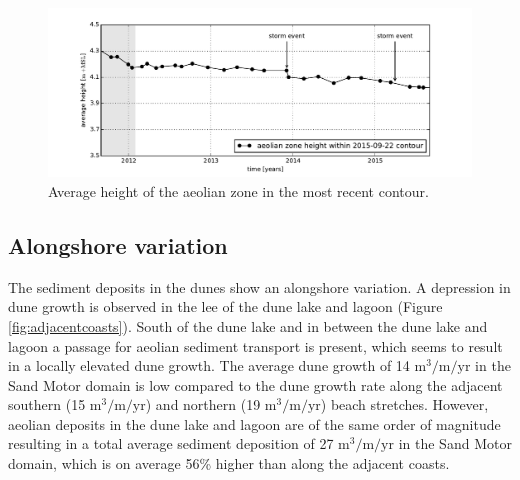 
\begin{figure}
  \centering
  \includegraphics[width=\columnwidth]{../Figures/heights}
  \caption{Average height of the aeolian zone in the most recent
    contour.}
  \label{fig:heights}
\end{figure}



\subsection{Alongshore variation}

The sediment deposits in the dunes show an alongshore
variation. A depression in dune growth is observed in the
lee of the dune lake and lagoon (Figure
\ref{fig:adjacentcoasts}). South of the dune lake and in between the
dune lake and lagoon a passage for aeolian sediment transport is
present, which seems to result in a locally elevated dune growth. The
average dune growth of 14 $\mathrm{m^3/m/yr}$ in the Sand Motor domain
is low compared to the dune growth rate along the adjacent southern
(15 $\mathrm{m^3/m/yr}$) and northern (19 $\mathrm{m^3/m/yr}$) beach
stretches.  However, aeolian deposits in the dune lake and lagoon are
of the same order of magnitude resulting in a total average sediment
deposition of 27 $\mathrm{m^3/m/yr}$ in the Sand Motor domain, which
is on average 56\% higher than along the adjacent coasts.

